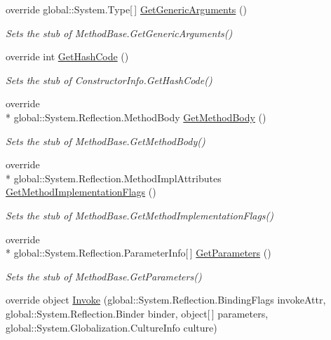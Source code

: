 \begin{DoxyCompactItemize}
override global\-::\-System.\-Type\mbox{[}$\,$\mbox{]} \hyperlink{class_system_1_1_reflection_1_1_fakes_1_1_stub_constructor_info_a21bcddea3e673f166319fb13cd441119}{Get\-Generic\-Arguments} ()
\begin{DoxyCompactList}\small\item\em Sets the stub of Method\-Base.\-Get\-Generic\-Arguments()\end{DoxyCompactList}\item 
override int \hyperlink{class_system_1_1_reflection_1_1_fakes_1_1_stub_constructor_info_aab8a1efa4308a5e2911ea519f0ef5368}{Get\-Hash\-Code} ()
\begin{DoxyCompactList}\small\item\em Sets the stub of Constructor\-Info.\-Get\-Hash\-Code()\end{DoxyCompactList}\item 
override \\*
global\-::\-System.\-Reflection.\-Method\-Body \hyperlink{class_system_1_1_reflection_1_1_fakes_1_1_stub_constructor_info_a4c4ca8eec7f4e1eee8650a5ef61a3cd2}{Get\-Method\-Body} ()
\begin{DoxyCompactList}\small\item\em Sets the stub of Method\-Base.\-Get\-Method\-Body()\end{DoxyCompactList}\item 
override \\*
global\-::\-System.\-Reflection.\-Method\-Impl\-Attributes \hyperlink{class_system_1_1_reflection_1_1_fakes_1_1_stub_constructor_info_a6084fac5b9f70e4aa5de10b1467faa21}{Get\-Method\-Implementation\-Flags} ()
\begin{DoxyCompactList}\small\item\em Sets the stub of Method\-Base.\-Get\-Method\-Implementation\-Flags()\end{DoxyCompactList}\item 
override \\*
global\-::\-System.\-Reflection.\-Parameter\-Info\mbox{[}$\,$\mbox{]} \hyperlink{class_system_1_1_reflection_1_1_fakes_1_1_stub_constructor_info_a7612ec72e66a32d8c506d0aa5554e50b}{Get\-Parameters} ()
\begin{DoxyCompactList}\small\item\em Sets the stub of Method\-Base.\-Get\-Parameters()\end{DoxyCompactList}\item 
override object \hyperlink{class_system_1_1_reflection_1_1_fakes_1_1_stub_constructor_info_ab656641500df10e900718ea59447da5e}{Invoke} (global\-::\-System.\-Reflection.\-Binding\-Flags invoke\-Attr, global\-::\-System.\-Reflection.\-Binder binder, object\mbox{[}$\,$\mbox{]} parameters, global\-::\-System.\-Globalization.\-Culture\-Info culture)

\end{DoxyCompactItemize}

